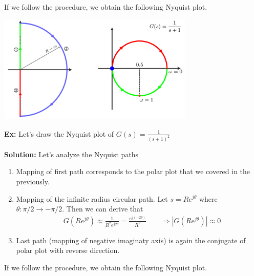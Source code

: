 \documentclass{article}
\begin{document}
If we follow the procedure, we obtain the following Nyquist plot. 

\vspace{6 pt}

  \begin{minipage}[h]{1\linewidth}
    \begin{center}
      \includegraphics[width=0.7\textwidth]{figs/ex2}
    \end{center}
  \end{minipage}

\vspace{6 pt}

\textbf{Ex:} Let's draw the Nyquist plot of 
$G(s) = \frac{1}{(s+1)^2}$ 

\textbf{Solution:} Let's analyze the Nyquist paths
%
\begin{enumerate}
  \item Mapping of first path corresponds to the polar plot that we covered in the previously. 
%
  \item Mapping of the infinite radius circular path. Let  $s = R e^{j \theta}$ where $\theta : \pi/2 \to -\pi/2$.  Then 
   we can derive that  
   \begin{align*}
     & G \left( R e^{j \theta} \right)  \approx \frac{1}{R^2 e^{j
       2 \theta}} = \frac{e^{j (-2 \theta)}}{R^2}
       \quad \quad
    \Rightarrow | G \left( R e^{j \theta} \right) | \approx 0
   \end{align*}
   \item Last path (mapping of negative imaginaty axis) is again
   the conjugate of polar plot with reverse direction. 
\end{enumerate}

If we follow the procedure, we obtain the following Nyquist plot. 

\vspace{6 pt}
\end{document}
